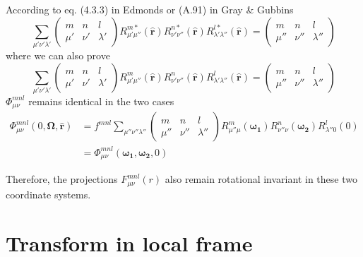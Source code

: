 According to eq. (4.3.3) in Edmonds \citep{Edmonds} or (A.91) in
Gray \& Gubbins \citep{Gray-Gubbins}
\begin{equation}
\sum_{\mu'\nu'\lambda'}\left(\begin{array}{ccc}
m & n & l\\
\mu' & \nu' & \lambda'
\end{array}\right)R_{\mu'\mu''}^{m*}(\mathbf{\hat{r}})R_{\nu'\nu''}^{n*}(\mathbf{\hat{r}})R_{\lambda'\lambda''}^{l*}(\mathbf{\hat{r}})=\left(\begin{array}{ccc}
m & n & l\\
\mu'' & \nu'' & \lambda''
\end{array}\right)
\end{equation}
where we can also prove
\begin{equation}
\sum_{\mu'\nu'\lambda'}\left(\begin{array}{ccc}
m & n & l\\
\mu' & \nu' & \lambda'
\end{array}\right)R_{\mu'\mu''}^{m}(\mathbf{\hat{r}})R_{\nu'\nu''}^{n}(\mathbf{\hat{r}})R_{\lambda'\lambda''}^{l}(\mathbf{\hat{r}})=\left(\begin{array}{ccc}
m & n & l\\
\mu'' & \nu'' & \lambda''
\end{array}\right)
\end{equation}
$\Phi_{\mu\nu}^{mnl}$ remains identical in the two cases
\begin{align}
\Phi_{\mu\nu}^{mnl}(0,\mathbf{\Omega},\mathbf{\hat{r}}) & =f^{mnl}\sum_{\mu''\nu''\lambda''}\left(\begin{array}{ccc}
m & n & l\\
\mu'' & \nu'' & \lambda''
\end{array}\right)R_{\mu''\mu}^{m}(\boldsymbol{\omega_{1}})R_{\nu''\nu}^{n}(\boldsymbol{\omega_{2}})R_{\lambda''0}^{l}(0)\nonumber \\
 & =\Phi_{\mu\nu}^{mnl}(\boldsymbol{\omega_{1}},\boldsymbol{\omega_{2}},0)
\end{align}

Therefore, the projections $F_{\mu\nu}^{mnl}(r)$ also remain rotational
invariant in these two coordinate systems.

\section{Transform in local frame}

